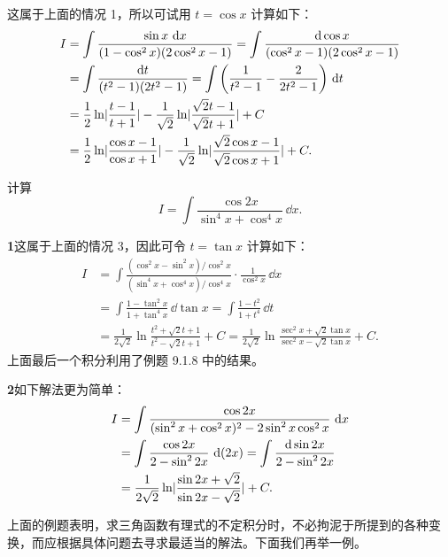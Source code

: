 \begin{xsolution}
这属于上面的情况 1，所以可试用 $t=\cos x$ 计算如下：
\begin{align*}
  I
  &=\int\frac{\sin x\,\mathop{}\!\mathrm{d} x}{(1-\cos^2x)(2\cos^2x-1)}
   =\int\frac{\mathop{}\!\mathrm{d}\cos x}{(\cos^2x-1)(2\cos^2x-1)}\\
  &=\int\frac{\mathop{}\!\mathrm{d} t}{(t^2-1)(2t^2-1)}
   =\int\left(\frac1{t^2-1}-\frac2{2t^2-1}\right)\,\mathop{}\!\mathrm{d} t\\
  &=\frac12\ln\lvert\frac{t-1}{t+1}\rvert
   -\frac1{\sqrt2}\ln\lvert\frac{\sqrt2t-1}{\sqrt2t+1}\rvert+C\\
  &=\frac12\ln\lvert\frac{\cos x-1}{\cos x+1}\rvert
   -\frac1{\sqrt2}\ln\lvert\frac{\sqrt2\cos x-1}{\sqrt2\cos x+1}\rvert+C.
\end{align*}
\end{xsolution}

\begin{xexample}[9.2.5]
计算
\[
  I=\int\frac{\cos2x}{\sin^4x+\cos^4x}\,\dd x.
\]
\end{xexample}

\begin{xsolution}
\textbf{1}\quad 这属于上面的情况 3，因此可令 $t=\tan x$ 计算如下：
\begin{align*}
  I
  &=\int\frac{(\cos^2x-\sin^2x)/\cos^2x}{(\sin^4x+\cos^4x)/\cos^4x}\cdot\frac1{\cos^2x}\,\dd x\\
  &=\int\frac{1-\tan^2x}{1+\tan^4x}\,\dd\tan x
   =\int\frac{1-t^2}{1+t^4}\,\dd t\\
  &=\frac1{2\sqrt2}\ln\frac{t^2+\sqrt2t+1}{t^2-\sqrt2t+1}+C
   =\frac1{2\sqrt2}\ln\frac{\sec^2x+\sqrt2\tan x}{\sec^2x-\sqrt2\tan x}+C.
\end{align*}
上面最后一个积分利用了例题 9.1.8 中的结果。
\end{xsolution}

\begin{xsolution}
\textbf{2}\quad 如下解法更为简单：
\begin{align*}
  I
  &=\int\frac{\cos2x}{(\sin^2x+\cos^2x)^2-2\sin^2x\cos^2x}\,\mathop{}\!\mathrm{d} x\\
  &=\int\frac{\cos2x}{2-\sin^22x}\,\mathop{}\!\mathrm{d}(2x)
   =\int\frac{\mathop{}\!\mathrm{d}\sin2x}{2-\sin^22x}\\
  &=\frac1{2\sqrt2}\ln\lvert\frac{\sin2x+\sqrt2}{\sin2x-\sqrt2}\rvert+C.
\end{align*}
\end{xsolution}

\begin{xremark}
上面的例题表明，求三角函数有理式的不定积分时，不必拘泥于所提到的各种变换，而应根据具体问题去寻求最适当的解法。下面我们再举一例。
\end{xremark}


